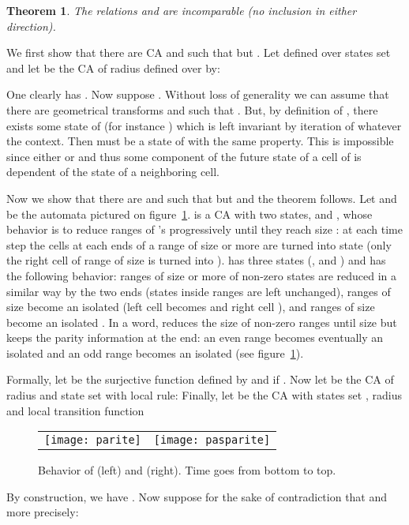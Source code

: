 \documentclass[a4paper]{elsarticle}
\newtheorem{thm}{Theorem}[section]
\begin{document}
\begin{thm}
  The relations  and  are incomparable (no
  inclusion in either direction).
\end{thm}
\begin{pf}
  We first show that there are CA  and  such that
   but .  Let  defined over states set  and let  be the CA of radius 
  defined over  by:
  
  One clearly has . Now suppose
  . Without loss of generality we can assume
  that there are geometrical transforms  and
   such that
  . But, by
  definition of , there exists some state  of
   (for instance ) which is left
  invariant by iteration of  whatever the
  context. Then  must be a state of 
  with the same property. This is impossible since either
   or  and thus some component of the future
  state of a cell of  is dependent of the state
  of a neighboring cell.
  

  Now we show that there are  and  such that
   but  and the theorem
  follows.  Let  and  be the automata pictured on
  figure~\ref{fig:diagab}.  is a CA with two states,  and
  , whose behavior is to reduce ranges of 's progressively until
  they reach size : at each time step the cells at each ends of a
  range of size  or more are turned into state  (only the right
  cell of range of size  is turned into ).  has three
  states (,  and ) and has the following behavior: ranges of
  size  or more of non-zero states are reduced in a similar way by
  the two ends (states inside ranges are left unchanged), ranges of
  size  become an isolated  (left cell becomes  and right
  cell ), and ranges of size  become an isolated . In a word,
   reduces the size of non-zero ranges until size  but keeps
  the parity information at the end: an even range becomes eventually
  an isolated  and an odd range becomes an isolated  (see
  figure~\ref{fig:diagab}).

  Formally, let  be the
  surjective function defined by  and  if
  . Now let  be the CA of radius  and state set
   with local rule:
   Finally, let  be the CA with states set
  , radius  and local transition function
   
  \begin{figure}[htbp]
    \centering
    \begin{tabular}{cc}
      \texttt{[image: parite]} & \texttt{[image: pasparite]}
    \end{tabular}
    \caption{\label{fig:diagab}Behavior of  (left) and 
      (right). Time goes from bottom to top.}
  \end{figure}
  By construction, we have . Now suppose for the
  sake of contradiction that  and more precisely:
  

\end{pf}
\end{document}
